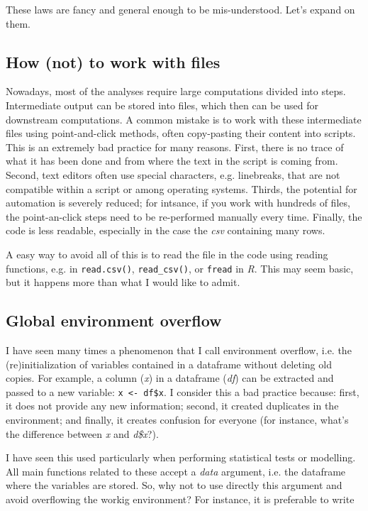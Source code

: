 \documentclass{book}
\begin{document}
These laws are fancy and general enough to be mis-understood. Let's expand on them.

\subsection{How (not) to work with files}

Nowadays, most of the analyses require large computations divided into steps. Intermediate output can be stored into files, which then can be used for downstream computations. A common mistake is to work with these intermediate files using point-and-click methods, often copy-pasting their content into scripts. This is an extremely bad practice for many reasons. First, there is no trace of what it has been done and from where the text in the script is coming from. Second, text editors often use special characters, e.g. linebreaks, that are not compatible within a script or among operating systems. Thirds, the potential for automation is severely reduced; for intsance, if you work with hundreds of files, the point-an-click steps need to be re-performed manually every time. Finally, the code is less readable, especially in the case the \textit{csv} containing many rows. 

A easy way to avoid all of this is to read the file in the code using reading functions, e.g. in \texttt{read.csv()}, \texttt{read\_csv()}, or \texttt{fread} in \textit{R}. This may seem basic, but it happens more than what I would like to admit.

\subsection{Global environment overflow}

I have seen many times a phenomenon that I call environment overflow, i.e. the (re)initialization of variables contained in a dataframe without deleting old copies. For example, a column (\textit{x}) in a dataframe (\textit{df}) can be extracted and passed to a new variable: \lstinline[columns=fixed]{x <- df$x}. I consider this a bad practice because: first, it does not provide any new information; second, it created duplicates in the environment; and finally, it creates confusion for everyone (for instance, what's the difference between \textit{x} and \textit{d\$x}?).

I have seen this used particularly when performing statistical tests or modelling. All main functions related to these accept a \textit{data} argument, i.e. the dataframe where the variables are stored. So, why not to use directly this argument and avoid overflowing the workig environment? For instance, it is preferable to write
\end{document}
